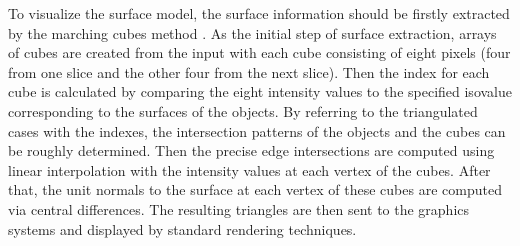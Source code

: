 To visualize the surface model, the surface information should be firstly extracted by the marching cubes method \cite{Lorensen1987MC}.
As the initial step of surface extraction, arrays of cubes are created from the input with each cube consisting of eight pixels (four from one slice and the other four from the next slice).
Then the index for each cube is calculated by comparing the eight intensity values to the specified isovalue corresponding to the surfaces of the objects.
By referring to the triangulated cases with the indexes, the intersection patterns of the objects and the cubes can be roughly determined.
Then the precise edge intersections are computed using linear interpolation with the intensity values at each vertex of the cubes.
After that, the unit normals to the surface at each vertex of these cubes are computed via central differences.
The resulting triangles are then sent to the graphics systems and displayed by standard rendering techniques.
